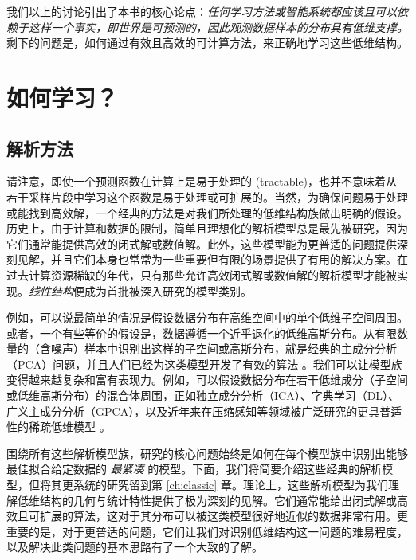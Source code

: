 \documentclass[../../book-main_zh.tex]{subfiles}
\begin{document}
我们以上的讨论引出了本书的核心论点：{\em 任何学习方法或智能系统都应该且可以依赖于这样一个事实，即世界是可预测的，因此观测数据样本的分布具有低维支撑。} 剩下的问题是，如何通过有效且高效的可计算方法，来正确地学习这些低维结构。

\section{如何学习？}


\subsection{解析方法}
\label{sec:analytical}
请注意，即使一个预测函数在计算上是易于处理的 (tractable)，也并不意味着从若干采样片段中学习这个函数是易于处理或可扩展的。当然，为确保问题易于处理或能找到高效解，一个经典的方法是对我们所处理的低维结构族做出明确的假设。历史上，由于计算和数据的限制，简单且理想化的解析模型总是最先被研究，因为它们通常能提供高效的闭式解或数值解。此外，这些模型能为更普适的问题提供深刻见解，并且它们本身也常常为一些重要但有限的场景提供了有用的解决方案。在过去计算资源稀缺的年代，只有那些允许高效闭式解或数值解的解析模型才能被实现。{\em 线性结构}便成为首批被深入研究的模型类别。

例如，可以说最简单的情况是假设数据分布在高维空间中的单个低维子空间周围。或者，一个有些等价的假设是，数据遵循一个近乎退化的低维高斯分布。从有限数量的（含噪声）样本中识别出这样的子空间或高斯分布，就是经典的主成分分析（PCA）问题，并且人们已经为这类模型开发了有效的算法 \cite{JolliffeI2002}。我们可以让模型族变得越来越复杂和富有表现力。例如，可以假设数据分布在若干低维成分（子空间或低维高斯分布）的混合体周围，正如独立成分分析（ICA）\cite{Ans-1985}、字典学习（DL）、广义主成分分析（GPCA）\cite{Vidal-GPCA}，以及近年来在压缩感知等领域被广泛研究的更具普适性的稀疏低维模型 \cite{Wright-Ma-2022}。

围绕所有这些解析模型族，研究的核心问题始终是如何在每个模型族中识别出能够最佳拟合给定数据的 {\em 最紧凑} 的模型。下面，我们将简要介绍这些经典的解析模型，但将其更系统的研究留到第 \ref{ch:classic} 章。理论上，这些解析模型为我们理解低维结构的几何与统计特性提供了极为深刻的见解。它们通常能给出闭式解或高效且可扩展的算法，这对于其分布可以被这类模型很好地近似的数据非常有用。更重要的是，对于更普适的问题，它们让我们对识别低维结构这一问题的难易程度，以及解决此类问题的基本思路有了一个大致的了解。
\end{document}
